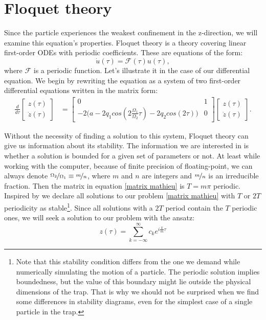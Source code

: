 \section{Floquet theory}
\label{sec:floquet}

Since the particle experiences the weakest confinement in the z-direction, we will examine this equation's properties. Floquet theory is a theory covering linear first-order ODEs with periodic coefficients. These are equations of the form:
\begin{equation}
	\dot{u}(\tau) = \mathcal{F}(\tau) u(\tau),
\end{equation}
where $\mathcal{F}$ is a periodic function. Let's illustrate it in the case of our differential equation. We begin by rewriting the equation  as a system of two first-order differential equations written in the matrix form:
\begin{align}
\label{matrix mathieu}
	\frac{d}{d \tau}
	\begin{bmatrix}
		z(\tau) \\
		\dot{z}(\tau)
	\end{bmatrix}	
	&=
	\begin{bmatrix}
		0 & 1 \\
		-2\bigg( a - 2 q_1 cos\left(2\frac{\Omega_1}{\Omega_2} \tau \right) - 2 q_2 cos(2\tau) \bigg) & 0	
	\end{bmatrix}
	\begin{bmatrix}
		z(\tau) \\
		\dot{z}(\tau)
	\end{bmatrix}.
\end{align}

Without the necessity of finding a solution to this system, Floquet theory can give us information about its stability. The information we are interested in is whether a solution is bounded for a given set of parameters or not. At least while working with the computer, because of finite precision of floating-point, we can always denote $\nicefrac{\Omega_2}{\Omega_1} \equiv \nicefrac{m}{n}$, where $m$ and $n$ are integers and $\nicefrac{m}{n}$ is an irreducible fraction. Then the matrix in equation \eqref{matrix mathieu} is $T = m \pi$ periodic. Inspired by \cite{leefer2017investigation} we declare all solutions to our problem \eqref{matrix mathieu} with $T$ or $2T$ periodicity as stable\footnote{Note that this stability condition differs from the one we demand while numerically simulating the motion of a particle. The periodic solution implies boundedness, but the value of this boundary might lie outside the physical dimensions of the trap. That is why we should not be surprised when we find some differences in stability diagrams, even for the simplest case of a single particle in the trap. 
}. Since all solutions with a $2T$ period contain the $T$ periodic ones, we will seek a solution to our problem with the ansatz:
\begin{equation}
	\label{Floquet ansatz}
	z(\tau) = \sum_{k=-\infty}^{\infty} c_k e^{i\frac{k}{m}\tau}
\end{equation}


